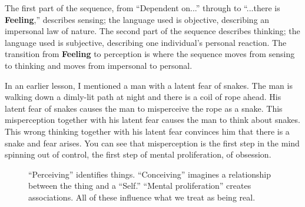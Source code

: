 The first part of the sequence, from “Dependent on...” through to “...there is \textbf{Feeling},” describes sensing; the language used is objective, describing an impersonal law of nature. The second part of the sequence describes thinking; the language used is subjective, describing one individual’s personal reaction. The transition from \textbf{Feeling} to perception is where the sequence moves from sensing to thinking and moves from impersonal to personal.

In an earlier lesson, I mentioned a man with a latent fear of snakes. The man is walking down a dimly-lit path at night and there is a coil of rope ahead. His latent fear of snakes causes the man to misperceive the rope as a snake. This misperception together with his latent fear causes the man to think about snakes. This wrong thinking together with his latent fear convinces him that there is a snake and fear arises. You can see that misperception is the first step in the mind spinning out of control, the first step of mental proliferation, of obsession.

\begin{figure}[H]
\centering

\caption{“Perceiving” identifies things. “Conceiving” imagines a relationship between the thing and a “Self.” “Mental proliferation” creates associations. All of these influence what we treat as being real.}
\label{fig:Reality}
\end{figure}

\pagebreak

